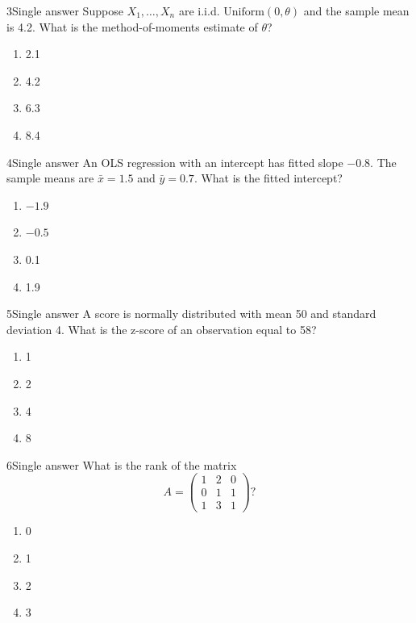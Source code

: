 \documentclass[10pt,a4paper]{article}
\begin{document}
\begin{questionbox}{3}{Single answer}
Suppose $X_1,\ldots,X_n$ are i.i.d. $\mathrm{Uniform}(0,\theta)$ and the sample mean is 4.2. What is the method-of-moments estimate of $\theta$?
\begin{enumerate}
  \item 2.1
  \item 4.2
  \item 6.3
  \item 8.4
\end{enumerate}
\end{questionbox}

\begin{questionbox}{4}{Single answer}
An OLS regression with an intercept has fitted slope $-0.8$. The sample means are $\bar{x}=1.5$ and $\bar{y}=0.7$. What is the fitted intercept?
\begin{enumerate}
  \item $-1.9$
  \item $-0.5$
  \item 0.1
  \item 1.9
\end{enumerate}
\end{questionbox}

\begin{questionbox}{5}{Single answer}
A score is normally distributed with mean 50 and standard deviation 4. What is the z-score of an observation equal to 58?
\begin{enumerate}
  \item 1
  \item 2
  \item 4
  \item 8
\end{enumerate}
\end{questionbox}

\begin{questionbox}{6}{Single answer}
What is the rank of the matrix
\[
A=\begin{pmatrix}
1&2&0\\
0&1&1\\
1&3&1
\end{pmatrix}?
\]
\begin{enumerate}
  \item 0
  \item 1
  \item 2
  \item 3
\end{enumerate}
\end{questionbox}
\end{document}

